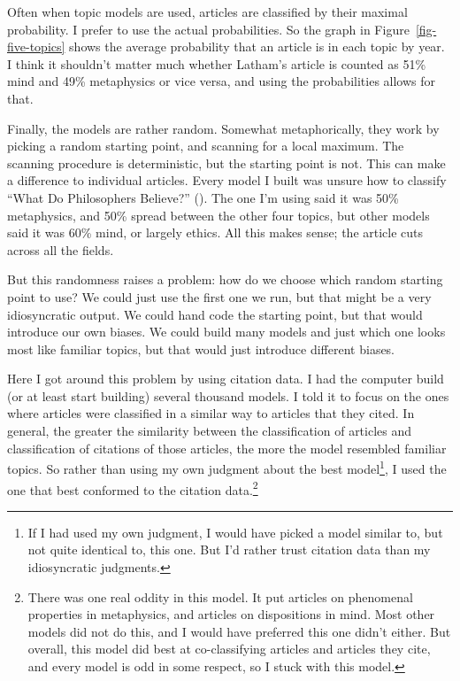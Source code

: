 \documentclass[
  11pt,
  letterpaper,
  DIV=11,
  numbers=noendperiod,
  twoside]{scrartcl}
\begin{document}
Often when topic models are used, articles are classified by their
maximal probability. I prefer to use the actual probabilities. So the
graph in Figure~\ref{fig-five-topics} shows the average probability that
an article is in each topic by year. I think it shouldn't matter much
whether Latham's article is counted as 51\% mind and 49\% metaphysics or
vice versa, and using the probabilities allows for that.

Finally, the models are rather random. Somewhat metaphorically, they
work by picking a random starting point, and scanning for a local
maximum. The scanning procedure is deterministic, but the starting point
is not. This can make a difference to individual articles. Every model I
built was unsure how to classify ``What Do Philosophers Believe?''
(). The one
I'm using said it was 50\% metaphysics, and 50\% spread between the
other four topics, but other models said it was 60\% mind, or largely
ethics. All this makes sense; the article cuts across all the fields.

But this randomness raises a problem: how do we choose which random
starting point to use? We could just use the first one we run, but that
might be a very idiosyncratic output. We could hand code the starting
point, but that would introduce our own biases. We could build many
models and just which one looks most like familiar topics, but that
would just introduce different biases.

Here I got around this problem by using citation data. I had the
computer build (or at least start building) several thousand models. I
told it to focus on the ones where articles were classified in a similar
way to articles that they cited. In general, the greater the similarity
between the classification of articles and classification of citations
of those articles, the more the model resembled familiar topics. So
rather than using my own judgment about the best model\footnote{If I had
  used my own judgment, I would have picked a model similar to, but not
  quite identical to, this one. But I'd rather trust citation data than
  my idiosyncratic judgments.}, I used the one that best conformed to
the citation data.\footnote{There was one real oddity in this model. It
  put articles on phenomenal properties in metaphysics, and articles on
  dispositions in mind. Most other models did not do this, and I would
  have preferred this one didn't either. But overall, this model did
  best at co-classifying articles and articles they cite, and every
  model is odd in some respect, so I stuck with this model.}
\end{document}
